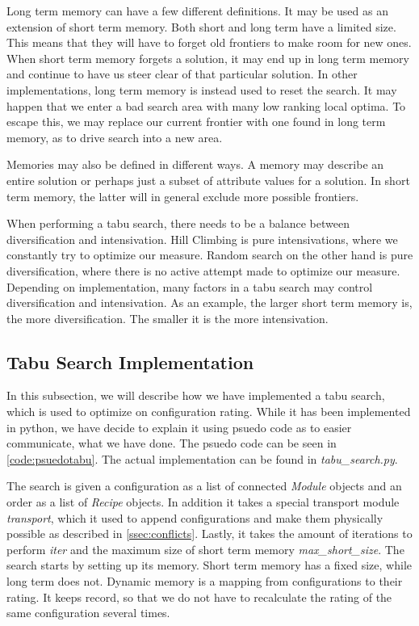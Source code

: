 Long term memory can have a few different definitions. It may be used as an extension of short term memory. Both short and long term have a limited size. This means that they will have to forget old frontiers to make room for new ones. When short term memory forgets a solution, it may end up in long term memory and continue to have us steer clear of that particular solution. In other implementations, long term memory is instead used to reset the search. It may happen that we enter a bad search area with many low ranking local optima. To escape this, we may replace our current frontier with one found in long term memory, as to drive search into a new area.

Memories may also be defined in different ways. A memory may describe an entire solution or perhaps just a subset of attribute values for a solution. In short term memory, the latter will in general exclude more possible frontiers. 

When performing a tabu search, there needs to be a balance between diversification and intensivation. Hill Climbing is pure intensivations, where we constantly try to optimize our measure. Random search on the other hand is pure diversification, where there is no active attempt made to optimize our measure. Depending on implementation, many factors in a tabu search may control diversification and intensivation. As an example, the larger short term memory is, the more diversification. The smaller it is the more intensivation.


\subsection{Tabu Search Implementation}
In this subsection, we will describe how we have implemented a tabu search, which is used to optimize on configuration rating. While it has been implemented in python, we have decide to explain it using psuedo code as to easier communicate, what we have done. The psuedo code can be seen in \cref{code:psuedotabu}. The actual implementation can be found in  \textit{tabu\_search.py}. 



The search is given a configuration as a list of connected \textit{Module} objects and an order as a list of \textit{Recipe} objects. In addition it takes a special transport module \textit{transport}, which it used to append configurations and make them physically possible as described in \cref{ssec:conflicts}. Lastly, it takes the amount of iterations to perform \textit{iter} and the maximum size of short term memory \textit{max\_short\_size}. The search starts by setting up its memory. Short term memory has a fixed size, while long term does not. Dynamic memory is a mapping from configurations to their rating. It keeps record, so that we do not have to recalculate the rating of the same configuration several times. 

